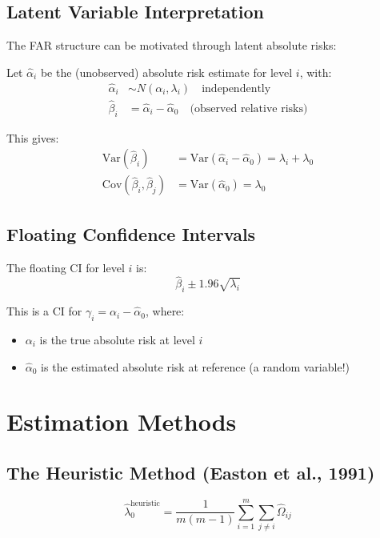 \documentclass[11pt]{article}
\begin{document}
\subsection{Latent Variable Interpretation}

The FAR structure can be motivated through latent absolute risks:

Let $\hat{\alpha}_i$ be the (unobserved) absolute risk estimate for level $i$, with:
\begin{align}
    \hat{\alpha}_i &\sim N(\alpha_i, \lambda_i) \quad \text{independently} \\
    \hat{\beta}_i &= \hat{\alpha}_i - \hat{\alpha}_0 \quad \text{(observed relative risks)}
\end{align}

This gives:
\begin{align}
    \text{Var}(\hat{\beta}_i) &= \text{Var}(\hat{\alpha}_i - \hat{\alpha}_0) = \lambda_i + \lambda_0 \\
    \text{Cov}(\hat{\beta}_i, \hat{\beta}_j) &= \text{Var}(\hat{\alpha}_0) = \lambda_0
\end{align}

\subsection{Floating Confidence Intervals}

The floating CI for level $i$ is:
\begin{equation}
    \hat{\beta}_i \pm 1.96\sqrt{\lambda_i}
\end{equation}

This is a CI for $\gamma_i = \alpha_i - \hat{\alpha}_0$, where:
\begin{itemize}
    \item $\alpha_i$ is the true absolute risk at level $i$
    \item $\hat{\alpha}_0$ is the estimated absolute risk at reference (a random variable!)
\end{itemize}

\section{Estimation Methods}

\subsection{The Heuristic Method (Easton et al., 1991)}

\begin{equation}
    \hat{\lambda}_0^{\text{heuristic}} = \frac{1}{m(m-1)} \sum_{i=1}^m \sum_{j \neq i} \hat{\Omega}_{ij}
\end{equation}
\end{document}
